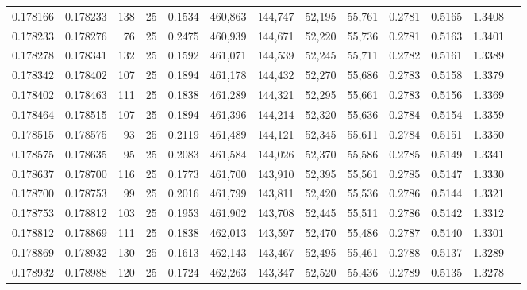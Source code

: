 \begin{tabular}{rrrrrrrrrrrrr}
0.178166 & 0.178233 &   138 &  25 &                                     0.1534 & 460,863 & 144,747 &  52,195 &  55,761 & 0.2781 & 0.5165 & 1.3408 \\
0.178233 & 0.178276 &    76 &  25 &                                     0.2475 & 460,939 & 144,671 &  52,220 &  55,736 & 0.2781 & 0.5163 & 1.3401 \\
0.178278 & 0.178341 &   132 &  25 &                                     0.1592 & 461,071 & 144,539 &  52,245 &  55,711 & 0.2782 & 0.5161 & 1.3389 \\
0.178342 & 0.178402 &   107 &  25 &                                     0.1894 & 461,178 & 144,432 &  52,270 &  55,686 & 0.2783 & 0.5158 & 1.3379 \\
0.178402 & 0.178463 &   111 &  25 &                                     0.1838 & 461,289 & 144,321 &  52,295 &  55,661 & 0.2783 & 0.5156 & 1.3369 \\
0.178464 & 0.178515 &   107 &  25 &                                     0.1894 & 461,396 & 144,214 &  52,320 &  55,636 & 0.2784 & 0.5154 & 1.3359 \\
0.178515 & 0.178575 &    93 &  25 &                                     0.2119 & 461,489 & 144,121 &  52,345 &  55,611 & 0.2784 & 0.5151 & 1.3350 \\
0.178575 & 0.178635 &    95 &  25 &                                     0.2083 & 461,584 & 144,026 &  52,370 &  55,586 & 0.2785 & 0.5149 & 1.3341 \\
0.178637 & 0.178700 &   116 &  25 &                                     0.1773 & 461,700 & 143,910 &  52,395 &  55,561 & 0.2785 & 0.5147 & 1.3330 \\
0.178700 & 0.178753 &    99 &  25 &                                     0.2016 & 461,799 & 143,811 &  52,420 &  55,536 & 0.2786 & 0.5144 & 1.3321 \\
0.178753 & 0.178812 &   103 &  25 &                                     0.1953 & 461,902 & 143,708 &  52,445 &  55,511 & 0.2786 & 0.5142 & 1.3312 \\
0.178812 & 0.178869 &   111 &  25 &                                     0.1838 & 462,013 & 143,597 &  52,470 &  55,486 & 0.2787 & 0.5140 & 1.3301 \\
0.178869 & 0.178932 &   130 &  25 &                                     0.1613 & 462,143 & 143,467 &  52,495 &  55,461 & 0.2788 & 0.5137 & 1.3289 \\
0.178932 & 0.178988 &   120 &  25 &                                     0.1724 & 462,263 & 143,347 &  52,520 &  55,436 & 0.2789 & 0.5135 & 1.3278 \\

\end{tabular}

